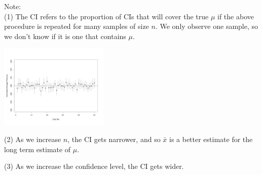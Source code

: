 \documentclass[t,xcolor=pdftex,dvipsnames,table]{beamer}
\begin{document}
\begin{frame}[fragile]{}

\vspace{.5cm}
Note: \\
(1) The CI refers to the proportion of CIs that will cover the true $\mu$ if the above procedure is repeated for many samples of size $n$. We only observe one sample, so we don't know if it is one that contains $\mu$. 

\includegraphics[height=4cm]{../images/CI.jpg} 

\vspace{.5cm}
(2) As we increase $n$, the CI gets narrower, and so $\bar{x}$ is a better estimate for the long term estimate of $\mu$.
\end{frame}

\begin{frame}[fragile]{}

\vspace{.5cm}
(3) As we increase the confidence level, the CI gets wider.
\end{frame}
\end{document}
